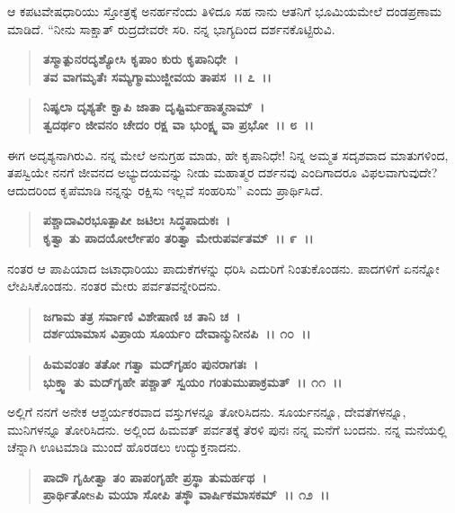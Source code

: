 ಆ ಕಪಟವೇಷಧಾರಿಯು ಸ್ತೋತ್ರಕ್ಕೆ ಅನರ್ಹನೆಂದು ತಿಳಿದೂ ಸಹ ನಾನು ಆತನಿಗೆ ಭೂಮಿಯಮೇಲೆ ದಂಡಪ್ರಣಾಮ ಮಾಡಿದೆ. “ನೀನು ಸಾಕ್ಷಾತ್ ರುದ್ರದೇವರೇ ಸರಿ. ನನ್ನ ಭಾಗ್ಯದಿಂದ ದರ್ಶನಕೊಟ್ಟಿರುವಿ.

\begin{verse}
\textbf{ತಸ್ಮಾತ್ಪುನರದೃಶ್ಯೋಸಿ ಕೃಪಾಂ ಕುರು ಕೃಪಾನಿಧೇ~।}\\\textbf{ತವ ವಾಗಮೃತೆಃ ಸಮ್ಯಗ್ಮಾಮುಜ್ಜೀವಯ ತಾಪಸ~।। ೭~।।} 
\end{verse}

\begin{verse}
\textbf{ನಿಷ್ಫಲಾ ದೃಶ್ಯತೇ ಕ್ವಾಪಿ ಜಾತಾ ದೃಷ್ಟಿರ್ಮಹಾತ್ಮನಾಮ್~।}\\\textbf{ತ್ವದರ್ಥಂ ಜೀವನಂ ಚೇದಂ ರಕ್ಷ ವಾ ಭುಂಕ್ಷ್ವ ವಾ ಪ್ರಭೋ~।। ೮~।।}
\end{verse}

ಈಗ ಅದೃಶ್ಯನಾಗಿರುವಿ. ನನ್ನ ಮೇಲೆ ಅನುಗ್ರಹ ಮಾಡು, ಹೇ ಕೃಪಾನಿಧೇ! ನಿನ್ನ ಅಮ್ಮತ ಸದೃಶವಾದ ಮಾತುಗಳಿಂದ, ತಪಸ್ವಿಯೇ ನನಗೆ ಜೀವನದ ಅಭ್ಯುದಯವನ್ನು ನೀಡು\enginline{-} ಮಹಾತ್ಮರ ದರ್ಶನವು ಎಂದಿಗಾದರೂ ವಿಫಲವಾಗುವುದೇ? ಆದುದರಿಂದ ಕೃಪೆಮಾಡಿ ನನ್ನನ್ನು ರಕ್ಷಿಸು ಇಲ್ಲವೆ ಸಂಹರಿಸು” ಎಂದು ಪ್ರಾರ್ಥಿಸಿದೆ.

\begin{verse}
\textbf{ಪಶ್ಚಾದಾವಿರಭೂತ್ಪಾಪೀ ಜಟಿಲಃ ಸಿದ್ಧಪಾದುಕಃ~।}\\\textbf{ಕೃತ್ವಾ ತು ಪಾದಯೋರ್ಲೇಪಂ ತರಿತ್ವಾ ಮೇರುಪರ್ವತಮ್~।। ೯~।।}
\end{verse}

ನಂತರ ಆ ಪಾಪಿಯಾದ ಜಟಾಧಾರಿಯು ಪಾದುಕೆಗಳನ್ನು ಧರಿಸಿ ಎದುರಿಗೆ ನಿಂತುಕೊಂಡನು. ಪಾದಗಳಿಗೆ ಏನನ್ನೋ ಲೇಪಿಸಿಕೊಂಡನು. ನಂತರ ಮೇರು ಪರ್ವತವನ್ನೇರಿದನು.

\begin{verse}
\textbf{ಜಗಾಮ ತತ್ರ ಸರ್ವಾಣಿ ವಿಶೇಷಾಣಿ ಚ ತಾನಿ ಚ~।}\\\textbf{ದರ್ಶಯಾಮಾಸ ವಿಪ್ರಾಯ ಸೂರ್ಯಂ ದೇವಾನ್ಮುನೀನಪಿ~।। ೧೦~।। }
\end{verse}

\begin{verse}
\textbf{ಹಿಮವಂತಂ ತತೋ ಗತ್ವಾ ಮದ್‌ಗೃಹಂ ಪುನರಾಗತಃ~।}\\\textbf{ಭುಕ್ತ್ವಾ ತು ಮದ್‌ಗೃಹೇ ಪಶ್ಚಾತ್ ಸ್ವಯಂ ಗಂತುಮುಪಾಕ್ರಮತ್~।। ೧೧~।।}
\end{verse}

ಅಲ್ಲಿಗೆ ನನಗೆ ಅನೇಕ ಆಶ್ಚರ್ಯಕರವಾದ ವಸ್ತುಗಳನ್ನೂ ತೋರಿಸಿದನು. ಸೂರ್ಯನನ್ನೂ, ದೇವತೆಗಳನ್ನೂ, ಮುನಿಗಳನ್ನೂ ತೋರಿಸಿದನು. ಅಲ್ಲಿಂದ ಹಿಮವತ್ ಪರ್ವತಕ್ಕೆ ತೆರಳಿ ಪುನಃ ನನ್ನ ಮನೆಗೆ ಬಂದನು. ನನ್ನ ಮನೆಯಲ್ಲಿ ಚೆನ್ನಾಗಿ ಊಟಮಾಡಿ ಮುಂದೆ ಹೊರಡಲು ಉದ್ಯುಕ್ತನಾದನು.

\begin{verse}
\textbf{ಪಾದೌ ಗೃಹೀತ್ವಾ ತಂ ಪಾಪಂಗೃಹೇ ಪ್ರಸ್ಥಾ ತುಮರ್ಹಥ~।}\\\textbf{ಪ್ರಾರ್ಥಿತೋsಪಿ ಮಯಾ ಸೋಪಿ ತಸ್ಥೌ ವಾರ್ಷಿಕಮಾಸಕಮ್~।। ೧೨~।।}
\end{verse}

